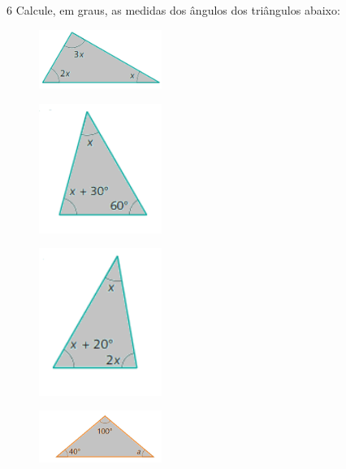 \num{6} Calcule, em graus, as medidas dos ângulos dos triângulos abaixo:

\begin{multicols}{2}
\begin{escolha}
\item
\begin{figure}[H]
\centering\includegraphics[width=4cm]{./imgSAEB_8_MAT/media/image24.png}
\end{figure}
\item
\begin{figure}[H]
\centering\includegraphics[width=4cm]{./imgSAEB_8_MAT/media/image25.png}
\end{figure}
\item
\begin{figure}[H]
\centering\includegraphics[width=4cm]{./imgSAEB_8_MAT/media/image26.png}
\end{figure}
\item
\begin{figure}[H]
\centering\includegraphics[width=4cm]{./imgSAEB_8_MAT/media/image27.png}
\end{figure}
\item
\begin{figure}[H]

\end{figure}
\end{escolha}
\end{multicols}
